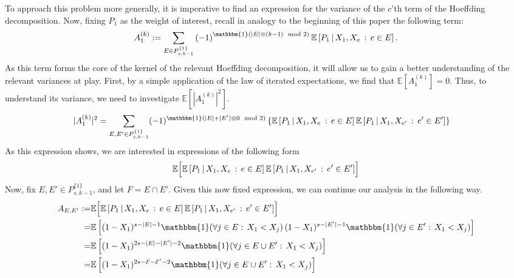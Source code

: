 \documentclass[letterpaper,10pt]{article}
\numberwithin{equation}{section}
\numberwithin{thm}{section}
\newcommand{\1}{\mathbb{1}}
\begin{document}
To approach this problem more generally, it is imperative to find an expression for the variance of the $c$'th term of the Hoeffding decomposition.
Now, fixing $P_1$ as the weight of interest, recall in analogy to the beginning of this paper the following term:
\begin{equation*}
	A_1^{(k)}
	:= \sum_{E \in P_{s,k-1}^{\{1\}}} \left(-1\right)^{\mathbbm{1}\left(|E| \equiv (k-1) \mod 2\right)} \mathbb{E}\left[P_1 \, | \, X_1, X_e \, : \, e \in E\right].
\end{equation*}
As this term forms the core of the kernel of the relevant Hoeffding decomposition, it will allow us to gain a better understanding of the relevant variances at play.
First, by a simple application of the law of iterated expectations, we find that $\mathbb{E}[A_1^{(k)}] = 0$.
Thus, to understand its variance, we need to investigate $\mathbb{E}\left[|A_1^{(k)}|^2\right]$.
\begin{equation*}
	\begin{aligned}
		|A_1^{(k)}|^2
		 & = \sum_{E, E' \in P_{s,k-1}^{\{1\}}}
		(-1)^{\mathbbm{1}(|E| + | E'| \equiv 0 \mod 2)}
		\left\{\mathbb{E}\left[P_1 \, | \, X_1, X_e \, : \, e \in E\right] \mathbb{E}\left[P_1 \, | \, X_1, X_{e'} \, : \, e' \in E'\right]\right\}
	\end{aligned}
\end{equation*}
As this expression shows, we are interested in expressions of the following form
\begin{equation*}
	\begin{aligned}
		\mathbb{E}\Bigl[\mathbb{E}\left[P_1 \, | \, X_1, X_e \, : \, e \in E\right] \mathbb{E}\left[P_1 \, | \, X_1, X_{e'} \, : \, e' \in E'\right]\Bigr]
	\end{aligned}
\end{equation*}
Now, fix $E, E' \in P_{s,k-1}^{\{1\}}$, and let $F = E \cap E'$.
Given this now fixed expression, we can continue our analysis in the following way.
\begin{equation*}
	\begin{aligned}
		A_{E, E'}
		:= & \mathbb{E}\Bigl[\mathbb{E}\left[P_1 \, | \, X_1, X_e \, : \, e \in E\right] \mathbb{E}\left[P_1 \, | \, X_1, X_{e'} \, : \, e' \in E'\right]\Bigr]        \\
		=  & \mathbb{E}\left[(1 - X_1)^{s-|E|-1} \mathbbm{1}(\forall j \in E: \, X_1 < X_j) \, (1 - X_1)^{s-|E'|-1} \mathbbm{1}(\forall j \in E': \, X_1 < X_j)\right] \\
		=  & \mathbb{E}\left[(1-X_1)^{2s - |E| - |E'| - 2}\mathbbm{1}(\forall j \in E \cup E': \, X_1 < X_j)\right]                                                    \\
		=  & \mathbb{E}\left[(1-X_1)^{2s - \mathcal{E} - \mathcal{E}' - 2}\mathbbm{1}(\forall j \in E \cup E': \, X_1 < X_j)\right]
	\end{aligned}
\end{equation*}
\end{document}
